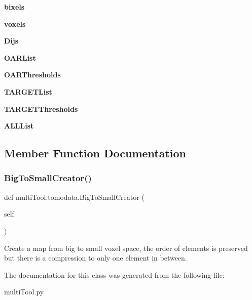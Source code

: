 \begin{DoxyCompactItemize}
{\bfseries bixels}
\item 
\mbox{\label{classmultiTool_1_1tomodata_a1b98b47fa0d4b79ab8c622004f1b6c53}} 
{\bfseries voxels}
\item 
\mbox{\label{classmultiTool_1_1tomodata_aedcfa502e133a1a3c1adfa3cc6f0206d}} 
{\bfseries Dijs}
\item 
\mbox{\label{classmultiTool_1_1tomodata_ad6b9090f1520f949ef2ece290c4d7e16}} 
{\bfseries O\+A\+R\+List}
\item 
\mbox{\label{classmultiTool_1_1tomodata_a95ef2d7a8c74f8b6c0565e59c744271d}} 
{\bfseries O\+A\+R\+Thresholds}
\item 
\mbox{\label{classmultiTool_1_1tomodata_aafd9434cff2f4f239926f81db973a33e}} 
{\bfseries T\+A\+R\+G\+E\+T\+List}
\item 
\mbox{\label{classmultiTool_1_1tomodata_a8a9521cc3c8084440be4e756344ba7ab}} 
{\bfseries T\+A\+R\+G\+E\+T\+Thresholds}
\item 
\mbox{\label{classmultiTool_1_1tomodata_a2c0f23209caf580b2f9c966d1e2c58e8}} 
{\bfseries A\+L\+L\+List}
\end{DoxyCompactItemize}


\subsection{Member Function Documentation}
\mbox{\label{classmultiTool_1_1tomodata_ae155fe953b7611fcf0dc7a261761ae15}} 
\subsubsection{\texorpdfstring{BigToSmallCreator()}{BigToSmallCreator()}}
{\footnotesize\ttfamily def multi\+Tool.\+tomodata.\+Big\+To\+Small\+Creator (\begin{DoxyParamCaption}\item[{}]{self }\end{DoxyParamCaption})}



Create a map from big to small voxel space, the order of elements is preserved but there is a compression to only one element in between. 



The documentation for this class was generated from the following file\+:\begin{DoxyCompactItemize}
\item 
multi\+Tool.\+py\end{DoxyCompactItemize}
